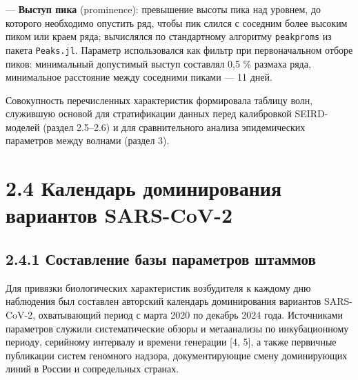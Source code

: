 \documentclass[12pt]{article}
\begin{document}
--- \textbf{Выступ пика} (prominence): превышение высоты пика над
уровнем, до которого необходимо опустить ряд, чтобы пик слился с
соседним более высоким пиком или краем ряда; вычислялся по стандартному
алгоритму \texttt{peakproms} из пакета \texttt{Peaks.jl}. Параметр
использовался как фильтр при первоначальном отборе пиков: минимальный
допустимый выступ составлял 0,5 \% размаха ряда, минимальное расстояние
между соседними пиками --- 11 дней.

Совокупность перечисленных характеристик формировала таблицу волн,
служившую основой для стратификации данных перед калибровкой
SEIRD-моделей (раздел 2.5--2.6) и для сравнительного анализа
эпидемических параметров между волнами (раздел 3).

\section{2.4 Календарь доминирования вариантов
SARS-CoV-2}\label{ux43aux430ux43bux435ux43dux434ux430ux440ux44c-ux434ux43eux43cux438ux43dux438ux440ux43eux432ux430ux43dux438ux44f-ux432ux430ux440ux438ux430ux43dux442ux43eux432-sars-cov-2}

\subsection{2.4.1 Составление базы параметров
штаммов}\label{ux441ux43eux441ux442ux430ux432ux43bux435ux43dux438ux435-ux431ux430ux437ux44b-ux43fux430ux440ux430ux43cux435ux442ux440ux43eux432-ux448ux442ux430ux43cux43cux43eux432}

Для привязки биологических характеристик возбудителя к каждому дню
наблюдения был составлен авторский календарь доминирования вариантов
SARS-CoV-2, охватывающий период с марта 2020 по декабрь 2024 года.
Источниками параметров служили систематические обзоры и метаанализы по
инкубационному периоду, серийному интервалу и времени генерации {[}4,
5{]}, а также первичные публикации систем геномного надзора,
документирующие смену доминирующих линий в России и сопредельных
странах.
\end{document}
